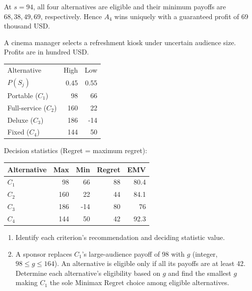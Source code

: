 At $s=94$, all four alternatives are eligible and their minimum
payoffs are $68,38,49,69$, respectively. Hence $A_4$ wins uniquely
with a guaranteed profit of 69 thousand USD.
\secInicio[sec:q1]



A cinema manager selects a refreshment kiosk under uncertain audience size. Profits are in hundred USD.

\begin{center}\small\setlength{\tabcolsep}{4pt}
	\begin{tabular}{lrr}\toprule
		Alternative & High & Low\\
		$P(S_j)$ & 0.45 & 0.55\\ \midrule
				Portable ($C_1$) & 98 & 66\\
		Full-service ($C_2$) & 160 & 22\\
		Deluxe ($C_3$) & 186 & -14\\
		Fixed ($C_4$) & 144 & 50\\
		\bottomrule
	\end{tabular}
\end{center} \vspace{-3mm}

Decision statistics (Regret = maximum regret):

\begin{center}\small\setlength{\tabcolsep}{4pt}
	\begin{tabular}{lrrrr}\toprule
		Alternative & Max & Min & Regret & EMV\\ \midrule
				$C_1$ & 98 & 66 & 88 & 80.4\\
		$C_2$ & 160 & 22 & 44 & 84.1\\
		$C_3$ & 186 & -14 & 80 & 76\\
		$C_4$ & 144 & 50 & 42 & 92.3\\
		\bottomrule
	\end{tabular}
\end{center}

\begin{enumerate}[label=\textbf{(\alph*)},leftmargin=*]
	\item Identify each criterion's recommendation and deciding statistic value. 

	\item A sponsor replaces $C_1$'s large-audience payoff of 98 with $g$ (integer, $98\leq g\leq164$). An alternative is eligible only if all its payoffs are at least 42. Determine each alternative's eligibility based on $g$ and find the smallest $g$ making $C_1$ the sole Minimax Regret choice among eligible alternatives. 
\end{enumerate}
\label{sol:q2a}
